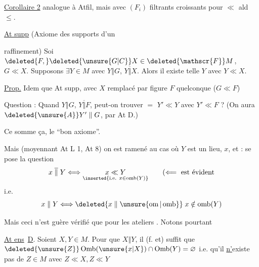
\uline{Corollaire 2}  analogue à Atfil, mais avec $(F_i)$ filtrants croissants pour $\ll$ ald $\leq$.

\uline{At supp} (Axiome des supports d'un
\par\noindent\vrule\hspace{.5em}\begin{minipage}{.94\linewidth}
raffinement) Soi $\deleted{F,}\deleted{\unsure{G|C}}X\in\deleted{\mathscr{F}}M$,  $G\ll X$. Supposons $\exists Y\in M$ avec $Y\mathrel{\Vert}G$, $Y\mathrel{\overline{\Vert}}X$. Alors  il existe  telle $Y$ avec $Y\ll X$.
\end{minipage}


\uline{Prop.} Idem que At supp, avec $X$ remplacé par figure $F$ quelconque ($G\ll F$)

Question : Quand $Y\mathrel{\Vert}G$, $Y\mathrel{\overline{\Vert}}F$, peut-on trouver $=$ $Y'\ll Y$ avec $Y'\ll F$ ? (On aura  $\deleted{\unsure{A}}Y'\mathrel{\Vert}G$, par At D.)

Ce  somme ça, le ``bon axiome''.

Mais (moyennant At L 1,  At 8) on est ramené au cas où $Y$ est un lieu,  $x$, et : se pose la question
\[
 x\mathrel{\overline{\Vert}}Y \Longleftrightarrow
 \underset{\inserted{\text{i.e. }x\in\operatorname{omb}(Y)}}{x\ll Y}
 \qquad (\Longleftarrow\ \text{est évident}
\]
i.e.
\[
 x\mathrel{\Vert}Y \Longleftrightarrow
 \deleted{x\mathrel{\Vert}\unsure{\operatorname{om}|\operatorname{omb}}}\;x\notin\operatorname{omb}(Y)
\]

Mais ceci n'est guère vérifié que pour les ateliers . Notons pourtant

\uline{At ens}\ \uline{D}.   Soient $X,Y\in M$. Pour que $X\mathrel{\Vert}Y$, il  (f. et) suffit que $\deleted{\unsure{Z}}\operatorname{Omb}(\unsure{x|X})\cap\operatorname{Omb}(Y)=\varnothing$ i.e. qu'il \uline{n'}existe pas de $Z\in M$ avec $Z\ll X,Z\ll Y$
